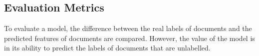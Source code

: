 

\subsection{Evaluation Metrics}\label{bg:metrics}

To evaluate a model, the difference between the real labels of documents and the predicted features of documents are compared. However, the value of the model is in its ability to predict the labels of documents that are unlabelled. 

